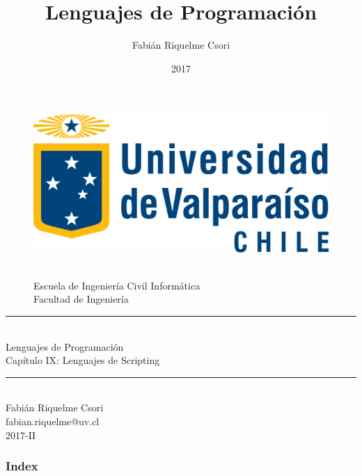 \documentclass[handout]{beamer} %
\title{Lenguajes de Programación}                     %
\author{Fabián Riquelme Csori}                        %
\date{2017}                                           %
\institute{Universidad de Valparaíso}                 %
\newcommand{\HRule}{\rule{\linewidth}{0.2mm}\\[1ex]}
\begin{document}
%

\begin{frame}[plain]
  \begin{figure}[h]
    \begin{minipage}{0.3\textwidth}
    \includegraphics[width=.9\textwidth]{./image/logo-UV.png}
    \end{minipage}
    \begin{minipage}{0.65\textwidth}
     $~$\\[3.6ex]
     \footnotesize{Escuela de Ingeniería Civil Informática}\\
     \footnotesize{Facultad de Ingeniería}
    \end{minipage}
  \end{figure}
  \begin{center}
    \vspace{1ex}
    \HRule
    \Large{Lenguajes de Programación}\\{\small Capítulo IX: Lenguajes de Scripting}\\[-1ex]
    \HRule\vspace{1ex}
    \large{Fabián Riquelme Csori}\\[.5ex]\footnotesize{fabian.riquelme@uv.cl}\\[6ex] {\tiny 2017-II}\\[6ex]
  \end{center}
\end{frame}

\begin{frame}
 \frametitle{Index}
 \scriptsize 			%
 \tableofcontents		%
\end{frame}
\end{document}
